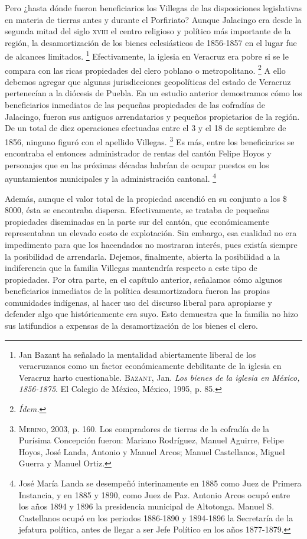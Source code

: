 \documentclass[14pt,twoside,final]{extbook} %
\let\oldfootnote\footnote
\renewcommand\footnote[1]{%
\oldfootnote{\hspace{1mm}#1}}
\begin{document}
Pero ¿hasta dónde fueron beneficiarios los Villegas de las disposiciones legislativas en materia de tierras antes y durante el Porfiriato? Aunque Jalacingo era desde la segunda mitad del siglo \textsc{xviii} el centro religioso y político más importante de la región, la desamortización de los bienes eclesiásticos de 1856-1857 en el lugar fue de alcances limitados.\footnote{Jan Bazant ha señalado la mentalidad abiertamente liberal de los veracruzanos como un factor económicamente debilitante de la iglesia en Veracruz harto cuestionable. \textsc{Bazant}, Jan. \emph{Los bienes de la iglesia en México, 1856-1875}. El Colegio de México, México, 1995, p. 85.} Efectivamente, la iglesia en Veracruz era pobre si se le compara con las ricas propiedades del clero poblano o metropolitano.\footnote{\em Ídem.} A ello debemos agregar que algunas jurisdicciones geopolíticas del estado de Veracruz pertenecían a la diócesis de Puebla. En un estudio anterior demostramos cómo los beneficiarios inmediatos de las pequeñas propiedades de las cofradías de Jalacingo, fueron sus antiguos arrendatarios y pequeños propietarios de la región. De un total de diez operaciones efectuadas entre el 3 y el 18 de septiembre de 1856, ninguno figuró con el apellido Villegas.\footnote{\textsc{Merino}, 2003, p. 160. Los compradores de tierras de la cofradía de la Purísima Concepción fueron: Mariano Rodríguez, Manuel Aguirre, Felipe Hoyos, José Landa, Antonio y Manuel Arcos; Manuel Castellanos, Miguel Guerra y Manuel Ortiz.} Es más, entre los beneficiarios se encontraba el entonces administrador de rentas del cantón Felipe Hoyos y personajes que en las próximas décadas habrían de ocupar puestos en los ayuntamientos municipales y la administración cantonal.\footnote{José María Landa se desempeñó interinamente en 1885 como Juez de Primera Instancia, y en 1885 y 1890, como Juez de Paz. Antonio Arcos ocupó entre los años 1894 y 1896 la presidencia municipal de Altotonga. Manuel S. Castellanos ocupó en los periodos 1886-1890 y 1894-1896 la Secretaría de la jefatura política, antes de llegar a ser Jefe Político en los años 1877-1879.}

Además, aunque el valor total de la propiedad ascendió en su conjunto a los \$ 8000, ésta se encontraba dispersa. Efectivamente, se trataba de pequeñas propiedades diseminadas en la parte sur del cantón, que económicamente representaban un elevado costo de explotación. Sin embargo, esa cualidad no era impedimento para que los hacendados no mostraran interés, pues existía siempre la posibilidad de arrendarla. Dejemos, finalmente, abierta la posibilidad a la indiferencia que la familia Villegas mantendría respecto a este tipo de propiedades. Por otra parte, en el capítulo anterior, señalamos cómo algunos beneficiarios inmediatos de la política desamortizadora fueron las propias comunidades indígenas, al hacer uso del discurso liberal para apropiarse y defender algo que históricamente era suyo. Esto demuestra que la familia no hizo sus latifundios a expensas de la desamortización de los bienes el clero.
\end{document}
